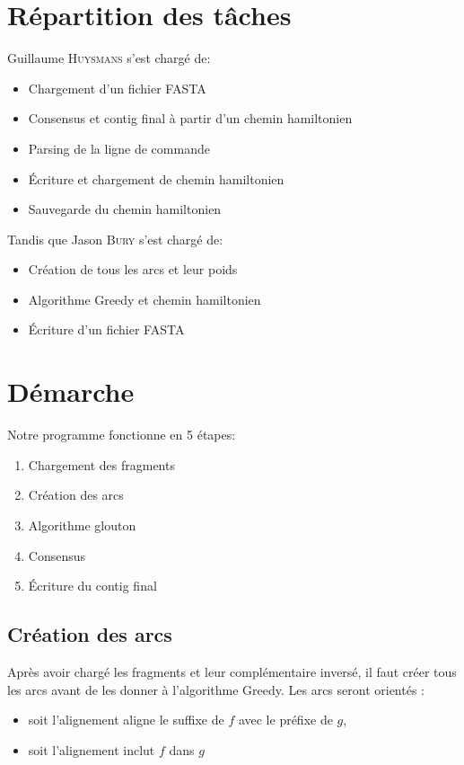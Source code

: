\documentclass[a4paper, 12pt, titlepage]{article}
\begin{document}



\section{Répartition des tâches}
\noindent Guillaume \textsc{Huysmans} s'est chargé de:
\begin{itemize}
 \item Chargement d'un fichier FASTA
 \item Consensus et contig final à partir d'un chemin hamiltonien
 \item Parsing de la ligne de commande
 \item Écriture et chargement de chemin hamiltonien
 \item Sauvegarde du chemin hamiltonien
\end{itemize}
\noindent Tandis que Jason \textsc{Bury} s'est chargé de:
\begin{itemize}
 \item Création de tous les arcs et leur poids
 \item Algorithme Greedy et chemin hamiltonien
 \item Écriture d'un fichier FASTA
\end{itemize}

\section{Démarche}
Notre programme fonctionne en 5 étapes:
\begin{enumerate}
 \item Chargement des fragments
 \item Création des arcs
 \item Algorithme glouton
 \item Consensus
 \item Écriture du contig final
\end{enumerate}

\subsection{Création des arcs}
Après avoir chargé les fragments et leur complémentaire inversé,
il faut créer tous les arcs avant de les donner à l'algorithme Greedy.
Les arcs seront orientés :
\begin{itemize}
	\item soit l'alignement aligne le suffixe de $f$ avec le préfixe de $g$,
	\item soit l'alignement inclut $f$ dans $g$
\end{itemize}
\end{document}

